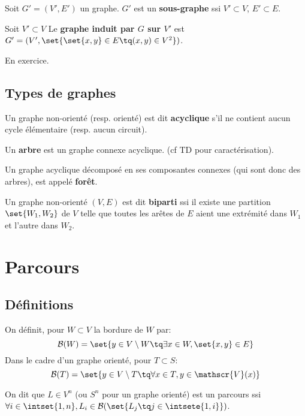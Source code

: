 \documentclass{scrartcl}
\begin{document}

			 Soit $G' = (V',E')$ un graphe.
			$G'$ est un \textbf{sous-graphe} ssi $V' \subset V$, $E' \subset E$.

			 Soit $V' \subset V$
			Le \textbf{graphe induit par $G$ sur $V'$} est $G' = (V', \set{\set{x,y}\in E \tq (x,y) \in V^2})$.

			\begin{demo}
				\item En exercice.
			\end{demo}
	
		\subsection{Types de graphes}
			 Un graphe non-orienté (resp. orienté) est dit \textbf{acyclique} s'il ne contient aucun cycle élémentaire (resp. aucun circuit).

			 Un \textbf{arbre} est un graphe connexe acyclique. (cf TD pour caractérisation).

			 Un graphe acyclique décomposé en ses composantes connexes (qui sont donc des arbres), est appelé \textbf{forêt}.

			 Un graphe non-orienté $(V,E)$ est dit \textbf{biparti} ssi il existe une partition $\set{W_1,W_2}$ de $V$ telle que toutes les arêtes de $E$
			aient une extrémité dans $W_1$ et l'autre dans $W_2$.



	\section{Parcours}
		\subsection{Définitions}
			On définit, pour $W \subset V$ la bordure de $W$ par:
				\[ 
					\mathcal{B}(W) = 
					\set{ y \in V\setminus W \tq \exists x \in W, \set{x,y} \in E}
				\]
			Dans le cadre d'un graphe orienté, pour $T \subset S$:
				\[ 
					\mathcal{B}(T) = 
					\set{ y \in V\setminus T \tq \forall x \in T, y \in \mathscr{V}(x) }
				\]

			On dit que $L\in V^n$ (ou $S^n$ pour un graphe orienté) est un parcours ssi $\forall i \in \intset{1,n}, L_i \in \mathcal{B}(\set{L_j \tq j \in \intsete{1,i}})$.
			
\end{document}
